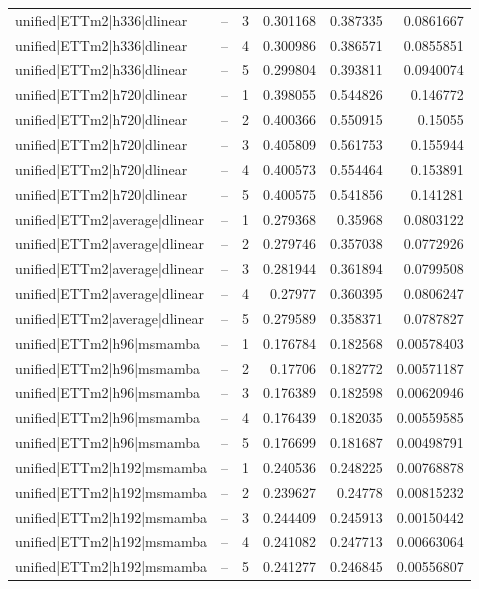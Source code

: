 \begin{longtable}{llrrrr}
unified|ETTm2|h336|dlinear & -- & 3 & 0.301168 & 0.387335 & 0.0861667 \\
unified|ETTm2|h336|dlinear & -- & 4 & 0.300986 & 0.386571 & 0.0855851 \\
unified|ETTm2|h336|dlinear & -- & 5 & 0.299804 & 0.393811 & 0.0940074 \\
unified|ETTm2|h720|dlinear & -- & 1 & 0.398055 & 0.544826 & 0.146772 \\
unified|ETTm2|h720|dlinear & -- & 2 & 0.400366 & 0.550915 & 0.15055 \\
unified|ETTm2|h720|dlinear & -- & 3 & 0.405809 & 0.561753 & 0.155944 \\
unified|ETTm2|h720|dlinear & -- & 4 & 0.400573 & 0.554464 & 0.153891 \\
unified|ETTm2|h720|dlinear & -- & 5 & 0.400575 & 0.541856 & 0.141281 \\
unified|ETTm2|average|dlinear & -- & 1 & 0.279368 & 0.35968 & 0.0803122 \\
unified|ETTm2|average|dlinear & -- & 2 & 0.279746 & 0.357038 & 0.0772926 \\
unified|ETTm2|average|dlinear & -- & 3 & 0.281944 & 0.361894 & 0.0799508 \\
unified|ETTm2|average|dlinear & -- & 4 & 0.27977 & 0.360395 & 0.0806247 \\
unified|ETTm2|average|dlinear & -- & 5 & 0.279589 & 0.358371 & 0.0787827 \\
unified|ETTm2|h96|msmamba & -- & 1 & 0.176784 & 0.182568 & 0.00578403 \\
unified|ETTm2|h96|msmamba & -- & 2 & 0.17706 & 0.182772 & 0.00571187 \\
unified|ETTm2|h96|msmamba & -- & 3 & 0.176389 & 0.182598 & 0.00620946 \\
unified|ETTm2|h96|msmamba & -- & 4 & 0.176439 & 0.182035 & 0.00559585 \\
unified|ETTm2|h96|msmamba & -- & 5 & 0.176699 & 0.181687 & 0.00498791 \\
unified|ETTm2|h192|msmamba & -- & 1 & 0.240536 & 0.248225 & 0.00768878 \\
unified|ETTm2|h192|msmamba & -- & 2 & 0.239627 & 0.24778 & 0.00815232 \\
unified|ETTm2|h192|msmamba & -- & 3 & 0.244409 & 0.245913 & 0.00150442 \\
unified|ETTm2|h192|msmamba & -- & 4 & 0.241082 & 0.247713 & 0.00663064 \\
unified|ETTm2|h192|msmamba & -- & 5 & 0.241277 & 0.246845 & 0.00556807 \\

\end{longtable}
